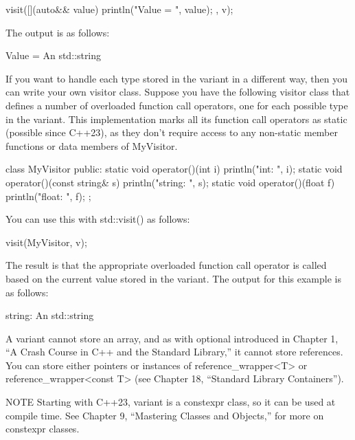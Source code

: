 \begin{cpp}
visit([](auto&& value) { println("Value = {}", value); }, v);
\end{cpp}

The output is as follows:

\begin{shell}
Value = An std::string
\end{shell}

If you want to handle each type stored in the variant in a different way, then you can write your own visitor class. Suppose you have the following visitor class that defines a number of overloaded function call operators, one for each possible type in the variant. This implementation marks all its function call operators as static (possible since C++23), as they don’t require access to any non-static member functions or data members of MyVisitor.

\begin{cpp}
class MyVisitor
{
    public:
        static void operator()(int i) { println("int: {}", i); }
        static void operator()(const string& s) { println("string: {}", s); }
        static void operator()(float f) { println("float: {}", f); }
};
\end{cpp}

You can use this with std::visit() as follows:

\begin{cpp}
visit(MyVisitor{}, v);
\end{cpp}

The result is that the appropriate overloaded function call operator is called based on the current value stored in the variant. The output for this example is as follows:

\begin{shell}
string: An std::string
\end{shell}

A variant cannot store an array, and as with optional introduced in Chapter 1, “A Crash Course in C++ and the Standard Library,” it cannot store references. You can store either pointers or instances of reference\_wrapper<T> or reference\_wrapper<const T> (see Chapter 18, “Standard Library Containers”).


\begin{myNotic}{NOTE}
Starting with C++23, variant is a constexpr class, so it can be used at compile time. See Chapter 9, “Mastering Classes and Objects,” for more on constexpr classes.
\end{myNotic}






